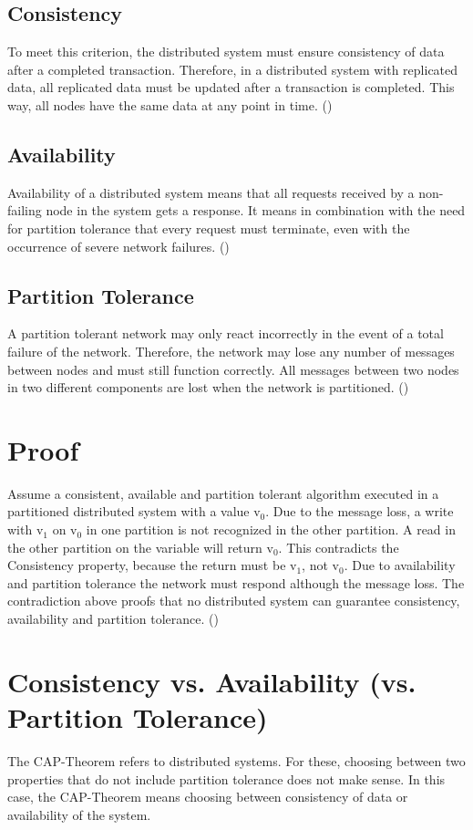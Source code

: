 \subsection*{Consistency}
To meet this criterion, the distributed system must ensure consistency of data after a completed transaction. Therefore, in a distributed system with replicated data, all replicated data must be updated after a transaction is completed. This way, all nodes have the same data at any point in time. (\cite[p.~2ff.]{brewer:2002})
\subsection*{Availability}
Availability of a distributed system means that all requests received by a non-failing node in the system gets a response. It means in combination with the need for partition tolerance that every request must terminate, even with the occurrence of severe network failures. (\cite[p.~3]{brewer:2002})
\subsection*{Partition Tolerance}
A partition tolerant network may only react incorrectly in the event of a total failure of the network. Therefore, the network may lose any number of messages between nodes and must still function correctly. All messages between two nodes in two different components are lost when the network is partitioned. (\cite[p.~3ff.]{brewer:2002})
\pagebreak
\section*{Proof}
Assume a consistent, available and partition tolerant algorithm executed in a partitioned distributed system with a value v$_{0}$. Due to the message loss, a write with v$_{1}$ on v$_{0}$ in one partition is not recognized in the other partition. A read in the other partition on the variable will return v$_{0}$. This contradicts the Consistency property, because the return must be v$_{1}$, not v$_{0}$. Due to availability and partition tolerance the network must respond although the message loss. The contradiction above proofs that no distributed system can guarantee consistency, availability and partition tolerance. (\cite[p.~4ff.]{brewer:2002})
\section*{Consistency vs. Availability (vs. Partition Tolerance)}
The \acs{CAP}-Theorem refers to distributed systems. For these, choosing between two properties that do not include partition tolerance does not make sense. In this case, the \acs{CAP}-Theorem means choosing between consistency of data or availability of the system.
